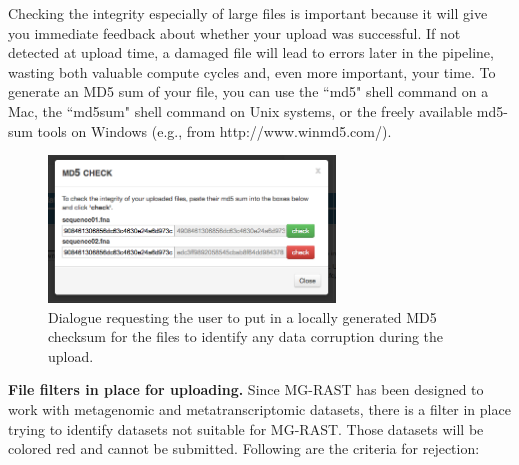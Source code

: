 \documentclass[12pt,fullpage]{report}
\begin{document}
Checking the integrity especially of large files is important because it will give you immediate feedback about whether your upload was successful. If not detected at upload time, a damaged file will lead to errors later in the pipeline, wasting both valuable compute cycles and, even more important, your time. To generate an \gls{MD5} sum of your file, you can use the ``md5" shell command on a Mac, the ``md5sum" shell command on Unix systems, or the freely available md5-sum tools on Windows (e.g., from http://www.winmd5.com/).



\begin{figure}[ht]
\begin{center}
\includegraphics[width=3in]{Images/upload-page-md5-verification.png}
\end{center}
\caption{
Dialogue requesting the user to put in a locally generated \gls{MD5} checksum for the files to identify any data corruption during the upload.
}
\label{fig:upload-page-md5-verification}
\end{figure}

{\bf File filters in place for uploading.}
Since MG-RAST has been designed to work with metagenomic and metatranscriptomic datasets, there is a filter in place trying to identify
datasets not suitable for MG-RAST. Those datasets will be colored red and cannot be submitted.
Following are the criteria for rejection:
\end{document}
